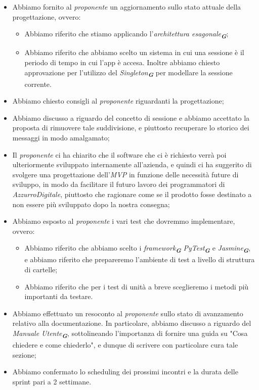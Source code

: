 \begin{itemize}
    \item Abbiamo fornito al \emph{proponente} un aggiornamento sullo stato attuale della progettazione, ovvero: 
        \begin{itemize}
            \item Abbiamo riferito che stiamo applicando l'\emph{architettura esagonale}\textsubscript{\textbf{\textit{G}}};
            \item Abbiamo riferito che abbiamo scelto un sistema in cui una sessione è il periodo di tempo in cui l'app è accesa.
            Inoltre abbiamo chiesto approvazione per l'utilizzo del \emph{Singleton}\textsubscript{\textbf{\textit{G}}} per modellare
            la sessione corrente.
        \end{itemize}
    \item Abbiamo chiesto consigli al \emph{proponente} riguardanti la progettazione;
    \item Abbiamo discusso a riguardo del concetto di sessione e abbiamo accettato la proposta di rimuovere tale suddivisione, e piuttosto
    recuperare lo storico dei messaggi in modo amalgamato;
    \item Il \emph{proponente} ci ha chiarito che il software che ci è richiesto verrà poi ulteriormente sviluppato internamente
    all'azienda, e quindi ci ha suggerito di svolgere una progettazione dell'\emph{MVP} in funzione delle necessità future di sviluppo, 
    in modo da facilitare il futuro lavoro dei programmatori di \emph{AzzurroDigitale}, piuttosto che ragionare come se il prodotto
    fosse destinato a non essere più sviluppato dopo la nostra consegna;
    \item Abbiamo esposto al \emph{proponente} i vari test che dovremmo implementare, ovvero:
        \begin{itemize}
            \item Abbiamo riferito che abbiamo scelto i \emph{framework}\textsubscript{\textbf{\textit{G}}}
            \emph{PyTest}\textsubscript{\textbf{\textit{G}}} e \emph{Jasmine}\textsubscript{\textbf{\textit{G}}}, e abbiamo riferito
            che prepareremo l'ambiente di test a livello di struttura di cartelle;
            \item Abbiamo riferito che per i test di unità a breve sceglieremo i metodi più importanti da testare.
        \end{itemize}
    \item Abbiamo effettuato un resoconto al \emph{proponente} sullo stato di avanzamento relativo alla documentazione. In particolare,
    abbiamo discusso a riguardo del \emph{Manuale Utente}\textsubscript{\textbf{\textit{G}}}, sottolineando l'importanza di fornire
    una guida su "Cosa chiedere e come chiederlo", e dunque di scrivere con particolare cura tale sezione;
    \item Abbiamo confermato lo scheduling dei prossimi incontri e la durata delle sprint pari a 2 settimane.


\end{itemize}